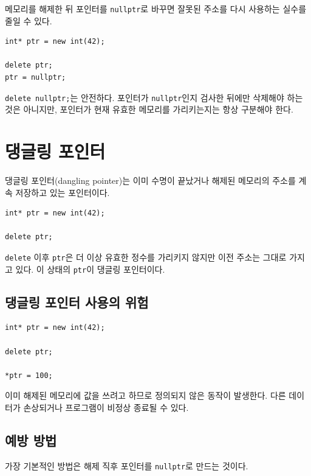 \documentclass[11pt,a4paper]{article}
\begin{document}
메모리를 해제한 뒤 포인터를 \texttt{nullptr}로 바꾸면 잘못된 주소를 다시 사용하는 실수를 줄일 수 있다.

\begin{lstlisting}
int* ptr = new int(42);

delete ptr;
ptr = nullptr;
\end{lstlisting}

\begin{importantbox}
\texttt{delete nullptr;}는 안전하다.
포인터가 \texttt{nullptr}인지 검사한 뒤에만 삭제해야 하는 것은 아니지만, 포인터가 현재 유효한 메모리를 가리키는지는 항상 구분해야 한다.
\end{importantbox}

\section{댕글링 포인터}

댕글링 포인터(dangling pointer)는 이미 수명이 끝났거나 해제된 메모리의 주소를 계속 저장하고 있는 포인터이다.

\begin{lstlisting}
int* ptr = new int(42);

delete ptr;
\end{lstlisting}

\texttt{delete} 이후 \texttt{ptr}은 더 이상 유효한 정수를 가리키지 않지만 이전 주소는 그대로 가지고 있다.
이 상태의 \texttt{ptr}이 댕글링 포인터이다.

\subsection{댕글링 포인터 사용의 위험}

\begin{lstlisting}
int* ptr = new int(42);

delete ptr;

*ptr = 100;
\end{lstlisting}

이미 해제된 메모리에 값을 쓰려고 하므로 정의되지 않은 동작이 발생한다.
다른 데이터가 손상되거나 프로그램이 비정상 종료될 수 있다.

\subsection{예방 방법}

가장 기본적인 방법은 해제 직후 포인터를 \texttt{nullptr}로 만드는 것이다.
\end{document}
